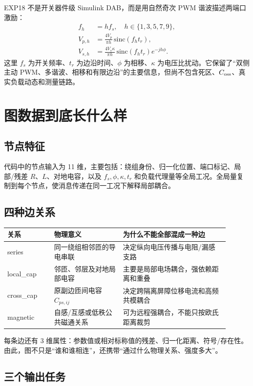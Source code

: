 \documentclass[UTF8,11pt,a4paper]{ctexart}
\begin{document}
EXP18 不是开关器件级 Simulink DAB，而是用自然奇次 PWM 谐波描述两端口激励：
\begin{align}
 f_h&=h f_s,\quad h\in\{1,3,5,7,9\},\\
 V_{p,h}&=\frac{4V_p}{\pi h}\,\mathrm{sinc}(f_h t_r),\\
 V_{s,h}&=\frac{4V_s\kappa}{\pi h}\,\mathrm{sinc}(f_h t_r)e^{-jh\phi}.
\end{align}
这里 $f_s$ 为开关频率、$t_r$ 为边沿时间、$\phi$ 为相移、$\kappa$ 为电压比扰动。它保留了“双侧主动 PWM、多谐波、相移和有限边沿”的主要信息，但尚不包含死区、$C_{\rm oss}$、真实负载动态和测量链路。

\section{图数据到底长什么样}

\subsection{节点特征}

代码中的节点输入为 11 维，主要包括：绕组身份、归一化位置、端口标记、局部/残差 $R$、$L$、对地电容，以及 $f_s,\phi,\kappa,t_r$ 和负载代理量等全局工况。全局量复制到每个节点，使消息传递在同一工况下解释局部耦合。

\subsection{四种边关系}

\begin{longtable}{p{0.19\linewidth}p{0.28\linewidth}p{0.43\linewidth}}
\toprule
关系 & 物理意义 & 为什么不能全部混成一种边\\
\midrule
series & 同一绕组相邻匝的导电串联 & 决定纵向电压传播与电阻/漏感支路\\
local\_cap & 邻匝、邻层及对地局部电容 & 主要是局部电场耦合，强依赖距离和重叠\\
cross\_cap & 原副边匝间电容 $C_{ps,ij}$ & 决定跨隔离屏障位移电流和高频共模耦合\\
magnetic & 自感/互感或低秩公共磁通关系 & 可为远程强耦合，不能只按欧氏距离裁剪\\
\bottomrule
\end{longtable}

每条边还有 3 维属性：参数值或相对标称值的残差、归一化距离、符号/存在性。由此，图不只是“谁和谁相连”，还携带“通过什么物理关系、强度多大”。

\subsection{三个输出任务}
\end{document}
